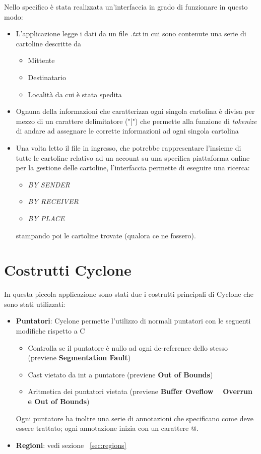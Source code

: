 Nello specifico è stata realizzata un'interfaccia in grado di funzionare in questo modo:
\begin{itemize}
	\item L'applicazione legge i dati da un file \textit{.txt} in cui sono contenute una serie di cartoline descritte da
	\begin{itemize}
		\item Mittente
		\item Destinatario
		\item Località da cui è stata spedita
	\end{itemize}
	\item Ognuna della informazioni che caratterizza ogni singola cartolina è divisa per mezzo di un carattere delimitatore ("|") che permette alla funzione di \textit{tokenize} di andare ad assegnare le corrette informazioni ad ogni singola cartolina
	\item Una volta letto il file in ingresso, che potrebbe rappresentare l'insieme di tutte le cartoline relativo ad un account su una specifica piattaforma online per la gestione delle cartoline, l'interfaccia permette di eseguire una ricerca:
	\begin{itemize}
		\item \textit{BY SENDER}
		\item \textit{BY RECEIVER}
		\item \textit{BY PLACE}
	\end{itemize}
	stampando poi le cartoline trovate (qualora ce ne fossero).
\end{itemize}

\section{Costrutti Cyclone}
In questa piccola applicazione sono stati due i costrutti principali di Cyclone che sono stati utilizzati:
\begin{itemize}
	\item \textbf{Puntatori}: Cyclone permette l'utilizzo di normali puntatori con le seguenti modifiche rispetto a C
	\begin{itemize}
		\item Controlla se il puntatore è nullo ad ogni de-reference dello stesso (previene \textbf{Segmentation Fault})
		\item Cast vietato da int a puntatore (previene \textbf{Out of Bounds})
		\item Aritmetica dei puntatori vietata (previene \textbf{Buffer Oveflow ~ Overrun e Out of Bounds})
	\end{itemize}
	Ogni puntatore ha inoltre una serie di annotazioni che specificano come deve essere trattato;
	ogni annotazione inizia con un carattere @. 
	
	\item \textbf{Regioni}: vedi sezione ~\ref{sec:regions}
\end{itemize}
